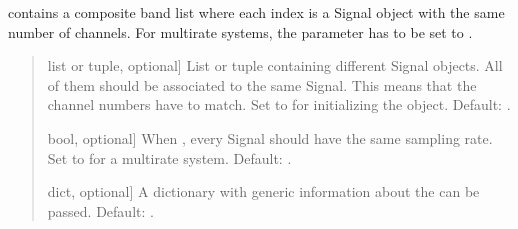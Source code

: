 \documentclass[letterpaper,10pt,english]{sphinxmanual}
\begin{document}
\begin{fulllineitems}
\begin{fulllineitems}
\label{\detokenize{classes:dsptoolbox.classes.multibandsignal.MultiBandSignal.__init__}}
\pysigstartsignatures
{}
\pysigstopsignatures
\sphinxAtStartPar
{} contains a composite band list where each index
is a Signal object with the same number of channels. For multirate
systems, the parameter  has to be set to .
\begin{quote}\begin{description}
\begin{description}
\sphinxlineitem{\sphinxstylestrong{bands}}{[}list or tuple, optional{]}
\sphinxAtStartPar
List or tuple containing different Signal objects. All of them
should be associated to the same Signal. This means that the
channel numbers have to match. Set to  for initializing the
object. Default: .

\sphinxlineitem{\sphinxstylestrong{same\_sampling\_rate}}{[}bool, optional{]}
\sphinxAtStartPar
When , every Signal should have the same sampling rate.
Set to  for a multirate system. Default: .

\sphinxlineitem{\sphinxstylestrong{info}}{[}dict, optional{]}
\sphinxAtStartPar
A dictionary with generic information about the 
can be passed. Default: .

\end{description}

\end{description}\end{quote}

\end{fulllineitems}



\end{fulllineitems}
\end{document}
